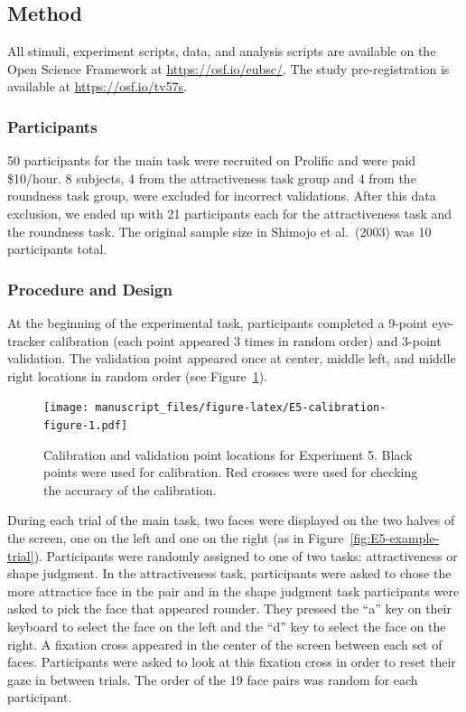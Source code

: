 \documentclass[
  man,floatsintext]{apa6}
\begin{document}
\subsection{Method}\label{method-4}

All stimuli, experiment scripts, data, and analysis scripts are
available on the Open Science Framework at \url{https://osf.io/eubsc/}.
The study pre-registration is available at
\url{https://osf.io/tv57s}.

\subsubsection{Participants}\label{participants-5}

50 participants for the main task were recruited on Prolific and were
paid \$10/hour. 8 subjects, 4 from the attractiveness task group and 4 from
the roundness task group, were excluded for incorrect validations.
After this
data exclusion, we ended up with 21 participants each for the
attractiveness task and the roundness task. The original sample size in
Shimojo et al.~(2003) was 10 participants total.

\subsubsection{Procedure and Design}\label{procedure-and-design}

At the beginning of the experimental task, participants completed a
9-point eye-tracker calibration (each point appeared 3 times in random
order) and 3-point validation. The validation point appeared once at
center, middle left, and middle right locations in random order (see Figure~\ref{fig:E5-calibration-figure}).

\begin{figure}
\centering
\texttt{[image: manuscript\_files/figure-latex/E5-calibration-figure-1.pdf]}
\caption{\label{fig:E5-calibration-figure}Calibration and validation point locations for Experiment 5. Black points were used for calibration. Red crosses were used for checking the accuracy of the calibration.}
\end{figure}

During each trial of the main task, two faces were displayed on the two
halves of the screen, one on the left and one on the right (as in Figure~\ref{fig:E5-example-trial}). Participants were randomly assigned to one of two tasks:
attractiveness or shape judgment. In the attractiveness task,
participants were asked to chose the more attractice face in the pair
and in the shape judgment task participants were asked to pick the face
that appeared rounder. They pressed the ``a'' key on their keyboard to
select the face on the left and the ``d'' key to select the face on the
right. A fixation cross appeared in the center of the screen between
each set of faces. Participants were asked to look at this fixation
cross in order to reset their gaze in between trials. The order of
the 19 face pairs was random for each participant.
\end{document}
